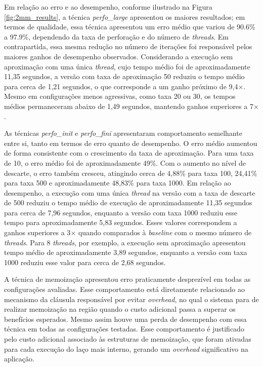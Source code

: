 Em relação ao erro e ao desempenho, conforme ilustrado na Figura \ref{fig:2mm_results}, a técnica \textit{perfo\_large} apresentou os maiores resultados; em termos de qualidade, essa técnica apresentou um erro médio que variou de 90.6\% a 97.9\%, dependendo da taxa de perforação e do número de \textit{threads}. Em contrapartida, essa mesma redução no número de iterações foi responsável pelos maiores ganhos de desempenho observados. Considerando a execução sem aproximação com uma única \textit{thread}, cujo tempo médio foi de aproximadamente 11,35 segundos, a versão com taxa de aproximação 50 reduziu o tempo médio para cerca de 1,21 segundos, o que corresponde a um ganho próximo de 9,4$\times$. Mesmo em configurações menos agressivas, como taxa 20 ou 30, os tempos médios permaneceram abaixo de 1,49 segundos, mantendo ganhos superiores a 7$\times$. 

As técnicas \textit{perfo\_init} e \textit{perfo\_fini} apresentaram comportamento semelhante entre si, tanto em termos de erro quanto de desempenho. O erro médio aumentou de forma consistente com o crescimento da taxa de aproximação. Para uma taxa de 10, o erro médio foi de aproximadamente 49\%. Com o aumento no nível de descarte, o erro também cresceu, atingindo cerca de 4,88\% para taxa 100, 24,41\% para taxa 500 e aproximadamente 48,83\% para taxa 1000. Em relação ao desempenho, a execução com uma única \textit{thread} na versão com a taxa de descarte de 500 reduziu o tempo médio de execução de aproximadamente 11,35 segundos para cerca de 7,96 segundos, enquanto a versão com taxa 1000 reduziu esse tempo para aproximadamente 5,83 segundos. Esses valores correspondem a ganhos superiores a 3$\times$ quando comparados à \textit{baseline} com o mesmo número de \textit{threads}. Para 8 \textit{threads}, por exemplo, a execução sem aproximação apresentou tempo médio de aproximadamente 3,89 segundos, enquanto a versão com taxa 1000 reduziu esse valor para cerca de 2,68 segundos.

A técnica de memoização apresentou erro praticamente desprezível em todas as configurações avaliadas. Esse comportamento está diretamente relacionado ao mecanismo da cláusula responsável por evitar \textit{overhead}, no qual o sistema para de realizar memoização na região quando o custo adicional passa a superar os benefícios esperados. Mesmo assim houve uma perda de desempenho com essa técnica em todas as configurações testadas. Esse comportamento é justificado pelo custo adicional associado às estruturas de memoização, que foram ativadas para cada execução do laço mais interno, gerando um \textit{overhead} significativo na aplicação.

